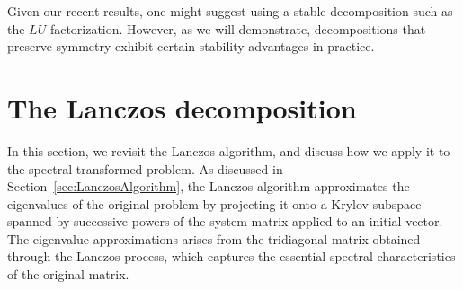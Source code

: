 Given our recent results, one might suggest using a stable decomposition such as the $LU$ factorization. However, as we will demonstrate, decompositions that preserve symmetry exhibit certain stability advantages in practice.

\section{The Lanczos decomposition}\label{sec:LanczosDecomposition}

In this section, we revisit the Lanczos algorithm, and discuss how we apply it to the spectral transformed problem. As discussed in Section~\ref{sec:LanczosAlgorithm}, the Lanczos algorithm approximates the eigenvalues of the original problem by projecting it onto a Krylov subspace spanned by successive powers of the system matrix applied to an initial vector. The eigenvalue approximations arises from the tridiagonal matrix obtained through the Lanczos process, which captures the essential spectral characteristics of the original matrix.

